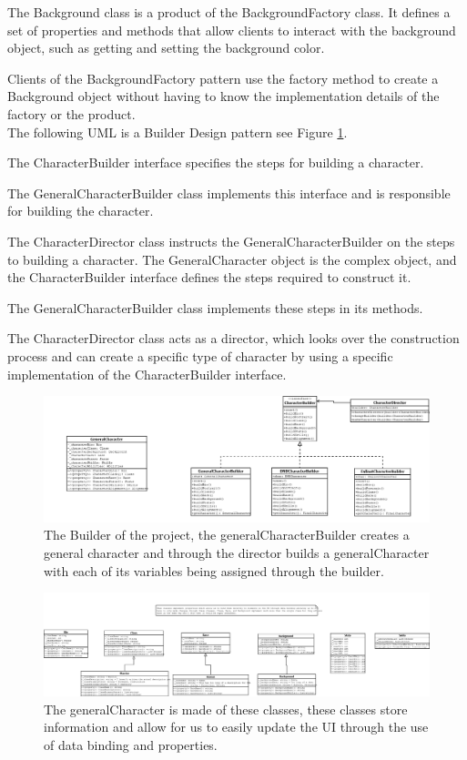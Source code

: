 \documentclass[10pt,conference,onecolumn,compsoc]{IEEEtran}
\begin{document}
The Background class is a product of the BackgroundFactory class. It defines a set of properties and methods that allow clients to interact with the background object, such as getting and setting the background color.

Clients of the BackgroundFactory pattern use the factory method to create a Background object without having to know the implementation details of the factory or the product.
\\[10pt]
The following UML is a Builder Design pattern see Figure \ref{charAndBuilder}.

The CharacterBuilder interface specifies the steps for building a character. 

The GeneralCharacterBuilder class implements this interface and is responsible for building the character. 

The CharacterDirector class instructs the GeneralCharacterBuilder on the steps to building a character.
 The GeneralCharacter object is the complex object, and the CharacterBuilder interface defines the steps required to construct it. 

The GeneralCharacterBuilder class implements these steps in its methods.

The CharacterDirector class acts as a director, which looks over  the construction process and can create a specific type of character by using a specific implementation of the CharacterBuilder interface.



\begin{figure}[ht!]
\includegraphics[scale=0.39]{builderAndChar.png}
\caption{The Builder of the project, the generalCharacterBuilder creates a general character and through the director builds a generalCharacter with each of its variables being assigned through the builder.}
\label{charAndBuilder}
\end{figure}

\begin{figure}[ht!]
\includegraphics[scale=0.28]{CharStuff.png}
\caption{The generalCharacter is made of these classes, these classes store information and allow for us to easily update the UI through the use of data binding and properties.}
\label{charStuff}
\end{figure}
\end{document}
